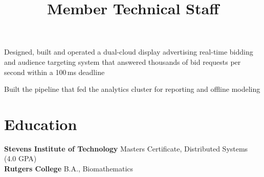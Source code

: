 \documentclass[margin,line]{resume}
\newenvironment{bullet-list}{
  \begin{list}{$\bullet$}{%
      \setlength{\itemsep}{0in}
      \setlength{\parsep}{0in} \setlength{\parskip}{0in}
      \setlength{\topsep}{0in} \setlength{\partopsep}{0in}
      \setlength{\leftmargin}{0.2in}}}{\end{list}}
\begin{document}
\begin{resume}
\title{Member Technical Staff}
\begin{position}
\vspace{-.3cm}
\begin{bullet-list}
\item Designed, built and operated a dual-cloud display advertising real-time bidding and audience targeting system that answered thousands of bid requests per second within a 100\,ms deadline
\item Built the pipeline that fed the analytics cluster for reporting and offline modeling
\end{bullet-list}
\end{position}

\section{\sc Education}
{\bf Stevens Institute of Technology} \hfill Masters Certificate, Distributed Systems (4.0 GPA)\\
{\bf Rutgers College} \hfill B.A., Biomathematics

\end{resume}
\end{document}
